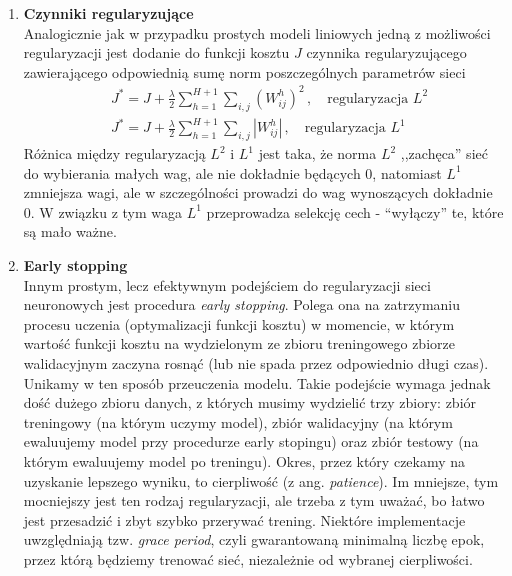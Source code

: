 \documentclass{myclass}
\begin{document}
\begin{enumerate}
    \item \textbf{Czynniki regularyzujące}\\
    Analogicznie jak w przypadku prostych modeli liniowych jedną z możliwości regularyzacji jest
    dodanie do funkcji kosztu \(J\) czynnika regularyzującego zawierającego odpowiednią sumę norm
    poszczególnych parametrów sieci
    \begin{equation*}
        \begin{split}
            &J^* = J + \frac{\lambda}{2}\sum_{h=1}^{H+1}\sum_{i,j} \left(W_{ij}^h\right)^2\,,\quad\text{regularyzacja \(L^2\)}\\
            &J^* = J + \frac{\lambda}{2}\sum_{h=1}^{H+1}\sum_{i,j} \left|W_{ij}^h\right|\,,\quad\text{regularyzacja \(L^1\)}
        \end{split}
    \end{equation*}
    Różnica między regularyzacją \(L^2\) i \(L^1\) jest taka, że norma \(L^2\) ,,zachęca” sieć do
    wybierania małych wag, ale nie dokładnie będących 0, natomiast \(L^1\) zmniejsza wagi, ale w
    szczególności prowadzi do wag wynoszących dokładnie 0. W związku z tym waga \(L^1\) przeprowadza
    selekcję cech - “wyłączy” te, które są mało ważne.

    \item \textbf{Early stopping}\\
    Innym prostym, lecz efektywnym podejściem do regularyzacji sieci neuronowych jest procedura
    \textit{early stopping}. Polega ona na zatrzymaniu procesu uczenia (optymalizacji funkcji
    kosztu) w momencie, w którym wartość funkcji kosztu na wydzielonym ze zbioru treningowego
    zbiorze walidacyjnym zaczyna rosnąć (lub nie spada przez odpowiednio długi czas). Unikamy w ten
    sposób przeuczenia modelu. Takie podejście wymaga jednak dość dużego zbioru danych, z których
    musimy wydzielić trzy zbiory: zbiór treningowy (na którym uczymy model), zbiór walidacyjny (na
    którym ewaluujemy model przy procedurze early stopingu) oraz zbiór testowy (na którym
    ewaluujemy model po treningu). Okres, przez który czekamy na uzyskanie lepszego wyniku, to
    cierpliwość (z ang. \textit{patience}). Im mniejsze, tym mocniejszy jest ten rodzaj
    regularyzacji, ale trzeba z tym uważać, bo łatwo jest przesadzić i zbyt szybko przerywać
    trening. Niektóre implementacje uwzględniają tzw. \textit{grace period}, czyli gwarantowaną
    minimalną liczbę epok, przez którą będziemy trenować sieć, niezależnie od wybranej cierpliwości.


\end{enumerate}
\end{document}
